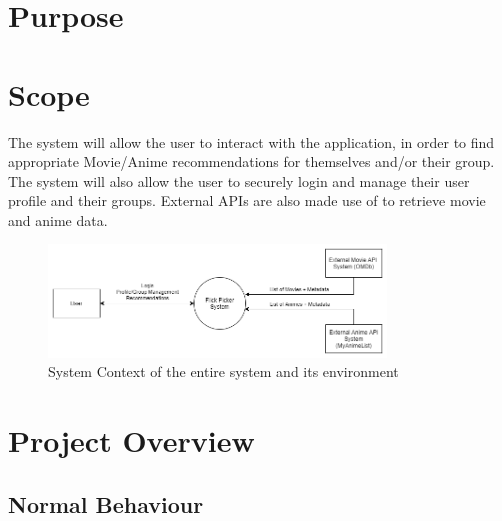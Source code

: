 \documentclass[12pt, titlepage]{article}
\begin{document}

\section{Purpose}



\section{Scope}

The system will allow the user to interact with the application, in order to find appropriate Movie/Anime recommendations for themselves and/or their group. The system will also allow the user to securely login and manage their user profile and their groups. External APIs are also made use of to retrieve movie and anime data.

\begin{figure}[H]
	\centering
	\includegraphics[width=0.8\textwidth]{SystemContext.png}
	\caption{System Context of the entire system and its environment}
	\label{FigUH}
\end{figure}

\section{Project Overview}

\subsection{Normal Behaviour}
\end{document}
